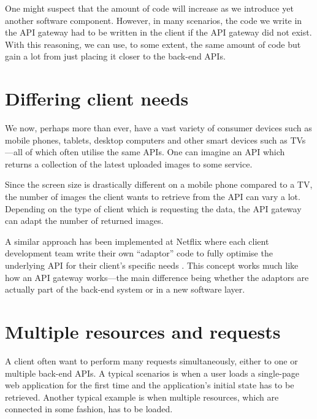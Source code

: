 \documentclass{cslthse-msc}
\begin{document}
One might suspect that the amount of code will increase as we introduce yet another software component. However, in many scenarios, the code we write in the API gateway had to be written in the client if the API gateway did not exist. With this reasoning, we can use, to some extent, the same amount of code but gain a lot from just placing it closer to the back-end APIs.

\section{Differing client needs}
We now, perhaps more than ever, have a vast variety of consumer devices such as mobile phones, tablets, desktop computers and other smart devices such as TVs---all of which often utilise the same APIs. One can imagine an API which returns a collection of the latest uploaded images to some service. 

Since the screen size is drastically different on a mobile phone compared to a TV, the number of images the client wants to retrieve from the API can vary a lot. Depending on the type of client which is requesting the data, the API gateway can adapt the number of returned images.

A similar approach has been implemented at Netflix where each client development team write their own \enquote{adaptor} code to fully optimise the underlying API for their client's specific needs \cite{netflix}. This concept works much like how an API gateway works---the main difference being whether the adaptors are actually part of the back-end system or in a new software layer.

\section{Multiple resources and requests}
A client often want to perform many requests simultaneously, either to one or multiple back-end APIs. A typical scenarios is when a user loads a single-page web application for the first time and the application's initial state has to be retrieved. Another typical example is when multiple resources, which are connected in some fashion, has to be loaded.
\end{document}
